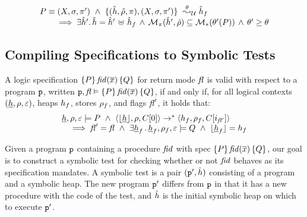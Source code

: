 \begin{theorem}
$$
\begin{array}{l}
P \equiv (\existentials, \sfs, \pfs') \ \wedge \ \unificationfull{\sheap, \sstore, \pc}{\existentials, \sfs, \pfs'}{\sheap_f}{\subst} \\ 
   \qquad \implies 
		\exists \sheap' . \, \sheap = \sheap' \dunion \sheap_f  \, \wedge \, 
		\smodels{\sheap', \sstore}{\pc} \subseteq \sepmodels{\subst'(P)}  \, \wedge \, 
		\subst' \geq \subst 
\end{array}
$$ 
\end{theorem}

\subsection{Compiling \jsil Specifications to Symbolic Tests}


\begin{definition}
A \jsil logic specification $\{ P \} \, \mathit{fid}(\overline{x}) \,  \{ Q \}$ for return mode $\mathit{fl}$ is valid with respect to a program 
$\mathtt{p}$, written $\mathtt{p}, \mathit{fl} \vDash \{ P \} \, \mathit{fid}(\overline{x}) \,  \{ Q \}$,  if and only if, for all logical 
contexts $(\underline{h}, \rho, \varepsilon)$, heaps $h_f$, stores $\rho_f$, and flags $\mathit{fl}'$, it holds that: 
$$
\begin{array}{l}
    \aheap, \store, \senv \satisfies P \ \wedge \ \tuple{\deabstract{\aheap}, \store, \ctx[0]} \rightarrow^* \tuple{\heap_f, \store_f, \ctx[i_{\flag'}]} \\
       \quad \implies
            \flag' = \flag \ \wedge \ \exists \aheap_f \, . \, \aheap_f, \store_f, \senv \satisfies Q \ \wedge \ \deabstract{\aheap_f} = \heap_f
\end{array}
$$
\end{definition}

\noindent Given a \jsil program $\mathtt{p}$ containing a procedure $\mathit{fid}$ with spec {\small $\{ P \} \, \mathit{fid}(\overline{x}) \,  \{ Q \}$}, 
our goal is to construct a symbolic test for checking whether or not $\mathit{fid}$ behaves as its specification mandates.
A symbolic test is a pair $(\mathtt{p}', \hat{h})$ consisting of a \jsil program and a symbolic heap. The new program $\mathtt{p}'$ 
differs from $\mathtt{p}$ in that it has a new \jsilmain procedure with the code of the test, and $\hat{h}$ is the initial 
symbolic heap on which to execute $\mathtt{p}'$. 

